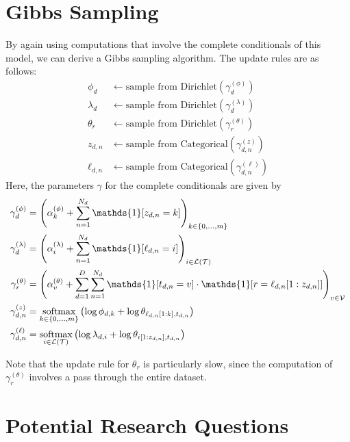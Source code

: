 \documentclass{article}
\newcommand{\indicator}{\mathds{1}}
\begin{document}
\section{Gibbs Sampling}

By again using computations that involve the complete conditionals of this model, we can derive a Gibbs sampling algorithm.
The update rules are as follows:
\begin{align}
\phi_d &\gets \text{sample from Dirichlet}(\gamma^{(\phi)}_d) \\
\lambda_d &\gets \text{sample from Dirichlet}(\gamma^{(\lambda)}_d) \\
\theta_r &\gets \text{sample from Dirichlet}(\gamma^{(\theta)}_r) \\
z_{d,n} &\gets \text{sample from Categorical}(\gamma^{(z)}_{d,n}) \\
\ell_{d,n} &\gets \text{sample from Categorical}(\gamma^{(\ell)}_{d,n})
\end{align}
%
Here, the parameters $\gamma$ for the complete conditionals are given by
\begin{align}
\gamma^{(\phi)}_d
&= \left( \alpha^{(\phi)}_k + \sum_\nWordSlot \indicator[z_{d,n} = k] \right)_\kDepthSet \\
%
\gamma^{(\lambda)}_d
&= \left( \alpha^{(\lambda)}_i + \sum_\nWordSlot \indicator[\ell_{d,n} = i] \right)_\iLeaf \\
%
\gamma^{(\theta)}_r
&= \left( \alpha^{(\theta)}_v + \sum_\dDoc \sum_\nWordSlot \indicator[t_{d,n} = v] \cdot \indicator[r = \ell_{d,n}[1:z_{d,n}]] \right)_\vVocab \\
%
\gamma^{(z)}_{d,n}
&= \softmax_\kDepthSet \left( \log \phi_{d,k} + \log \theta_{\ell_{d,n}[1:k], t_{d,n}} \right) \\
%
\gamma^{(\ell)}_{d,n}
&= \softmax_\iLeaf \left( \log \lambda_{d,i} + \log \theta_{i[1:z_{d,n}], t_{d,n}} \right)
\end{align}

Note that the update rule for $\theta_r$ is particularly slow, since the computation of $\gamma^{(\theta)}_r$ involves a pass through the entire dataset.


\section{Potential Research Questions}
\end{document}
